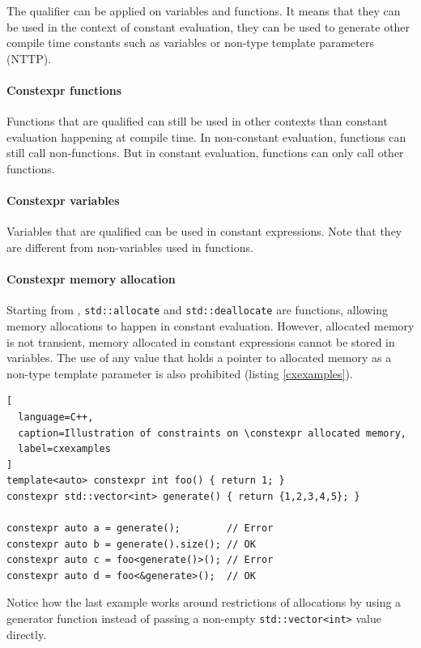 \documentclass[../../main.tex]{subfiles}
\begin{document}
The \constexpr qualifier can be applied on variables and functions. It means
that they can be used in the context of constant evaluation, \ie they can be
used to generate other compile time constants such as \constexpr variables
or non-type template parameters (NTTP).

\paragraph{Constexpr functions} Functions that are \constexpr qualified can
still be used in other contexts than constant evaluation happening at
compile time. In non-constant evaluation, \constexpr functions can still call
non-\constexpr functions. But in constant evaluation, \constexpr functions can
only call other \constexpr functions.


\paragraph{Constexpr variables} Variables that are \constexpr qualified can be
used in constant expressions. Note that they are different from
non-\constexpr variables used in \constexpr functions.


\paragraph{Constexpr memory allocation} Starting from ,
\lstinline|std::allocate| and \lstinline|std::deallocate| are
\constexpr functions, allowing memory allocations to happen in constant
evaluation. However,
\constexpr allocated memory is not transient, \ie memory allocated in
constant expressions cannot be stored in \constexpr variables.
The use of any value that holds a pointer to \constexpr allocated memory as a
non-type template parameter is also prohibited (listing \ref{cxexamples}).

\begin{lstlisting}[
  language=C++,
  caption=Illustration of constraints on \constexpr allocated memory,
  label=cxexamples
]
template<auto> constexpr int foo() { return 1; }
constexpr std::vector<int> generate() { return {1,2,3,4,5}; }

constexpr auto a = generate();        // Error
constexpr auto b = generate().size(); // OK
constexpr auto c = foo<generate()>(); // Error
constexpr auto d = foo<&generate>();  // OK
\end{lstlisting}

Notice how the last example works around restrictions of \constexpr allocations
by using a generator function instead of passing a non-empty
\lstinline|std::vector<int>| value directly.
\end{document}
